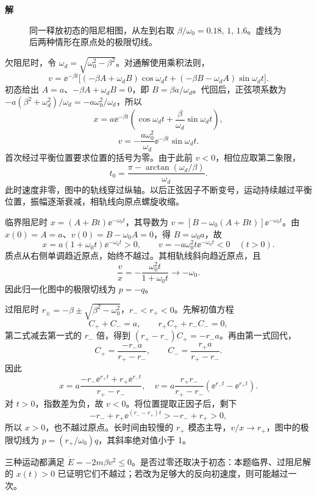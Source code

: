 \documentclass[11pt,openany,fontset=fandol]{ctexbook}
\theoremstyle{definition}\newtheorem{example}{例}[chapter]\newtheorem{exercise}{习题}[chapter]
\newcommand{\SolutionStart}{\par\medskip\ifdim\pagetotal>0pt\ifdim\dimexpr\pagegoal-\pagetotal\relax<3\baselineskip\newpage\fi\fi\noindent\textbf{解}\quad\ignorespaces}
\newenvironment{solution}{\SolutionStart}{\par\medskip}
\begin{document}
\begin{solution}
\begin{figure}[H]
\caption{同一释放初态的阻尼相图，从左到右取 $\beta/\omega_0=0.18,\,1,\,1.6$。虚线为后两种情形在原点处的极限切线。}\label{mp4:fig:l4-e8-s}
\end{figure}

欠阻尼时，令 $\omega_d=\sqrt{\omega_0^2-\beta^2}$。对通解使用乘积法则，
\[
v=\ee^{-\beta t}\bigl[(-\beta A+\omega_dB)\cos\omega_dt
+(-\beta B-\omega_dA)\sin\omega_dt\bigr].
\]
初态给出 $A=a$、$-\beta A+\omega_dB=0$，即 $B=\beta a/\omega_d$。代回后，正弦项系数为 $-a(\beta^2+\omega_d^2)/\omega_d=-a\omega_0^2/\omega_d$，所以
\[
x=a\ee^{-\beta t}\left(\cos\omega_dt+\frac\beta{\omega_d}\sin\omega_dt\right),
\]
\[
v=-\frac{a\omega_0^2}{\omega_d}\ee^{-\beta t}\sin\omega_dt.
\]
首次经过平衡位置要求位置的括号为零。由于此前 $v<0$，相位应取第二象限，
\[
t_0=\frac{\pi-\arctan(\omega_d/\beta)}{\omega_d}.
\]
此时速度非零，图中的轨线穿过纵轴。以后正弦因子不断变号，运动持续越过平衡位置，振幅逐渐衰减，相轨线向原点螺旋收缩。

临界阻尼时 $x=(A+Bt)\ee^{-\omega_0t}$，其导数为 $v=[B-\omega_0(A+Bt)]\ee^{-\omega_0t}$。由 $x(0)=A=a$、$v(0)=B-\omega_0A=0$，得 $B=\omega_0a$，故
\[
x=a(1+\omega_0t)\ee^{-\omega_0t}>0,\qquad
v=-a\omega_0^2t\ee^{-\omega_0t}<0\quad(t>0).
\]
质点从右侧单调趋近原点，始终不越过。其相轨线斜向趋近原点，且
\[
\frac vx=-\frac{\omega_0^2t}{1+\omega_0t}\longrightarrow-\omega_0.
\]
因此归一化图中的极限切线为 $p=-q$。

过阻尼时 $r_\pm=-\beta\pm\sqrt{\beta^2-\omega_0^2}$，$r_-<r_+<0$。先解初值方程
\[
C_++C_-=a,\qquad r_+C_++r_-C_-=0,
\]
第二式减去第一式的 $r_-$ 倍，得到 $(r_+-r_-)C_+=-r_-a$。再由第一式回代，
\[
C_+=\frac{-r_-a}{r_+-r_-},\qquad
C_-=\frac{r_+a}{r_+-r_-}.
\]
因此
\[
x=a\frac{-r_-\ee^{r_+t}+r_+\ee^{r_-t}}{r_+-r_-},
\quad
v=a\frac{r_+r_-}{r_+-r_-}
(\ee^{r_-t}-\ee^{r_+t}).
\]
对 $t>0$，指数差为负，故 $v<0$。将位置提取正因子后，剩下
\[
-r_-+r_+\ee^{(r_--r_+)t}>-r_-+r_+>0,
\]
所以 $x>0$，也不越过原点。长时间由较慢的 $r_+$ 模态主导，$v/x\to r_+$，图中的极限切线为 $p=(r_+/\omega_0)q$，其斜率绝对值小于 1。

三种运动都满足 $\dot E=-2m\beta v^2\le0$。是否过零还取决于初态：本题临界、过阻尼解的 $x(t)>0$ 已证明它们不越过；若改为足够大的反向初速度，则可能越过一次。
\end{solution}
\end{document}

